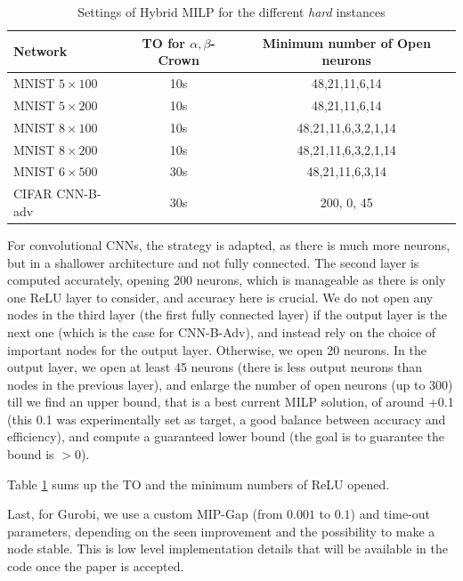 \begin{table}[t!]
	\centering
	\begin{tabular}{||l||c|c||}
		\hline \hline
		Network & TO for $\alpha,\beta$-Crown  & Minimum number of Open neurons  \\ 		  
		\hline
		MNIST $5 \times 100$ & 10s  & 48,21,11,6,14  \\ \hline
		MNIST $5 \times 200$ & 10s & 48,21,11,6,14  \\ \hline
		MNIST $8 \times 100$ & 10s  & 48,21,11,6,3,2,1,14  \\ \hline
		MNIST $8 \times 200$ & 10s & 48,21,11,6,3,2,1,14  \\ \hline
		MNIST $6 \times 500$ & 30s & 48,21,11,6,3,14 \\ \hline
		CIFAR CNN-B-adv & 30s & 200, 0, 45 \\ \hline \hline
	\end{tabular}
	\caption{Settings of Hybrid MILP for the different {\em hard} instances}
	\label{table20}
	\end{table}


For convolutional CNNs, the strategy is adapted, as there is much more neurons, but in a shallower architecture and not fully connected. 
The second layer is computed accurately, opening 200 neurons, which is manageable as there is only one ReLU layer to consider, and accuracy here is crucial.
We do not open any nodes in the third layer (the first fully connected layer) if the output layer is the next one (which is the case for CNN-B-Adv), and instead rely on the choice of important nodes for the output layer. Otherwise, we open 20 neurons.
In the output layer, we open at least 45 neurons (there is less output neurons than nodes in the previous layer), and enlarge the number of open neurons (up to 300) till we find an upper bound, that is a best current MILP solution, of around +0.1 (this 0.1 was experimentally set as target, a good balance between accuracy and efficiency), and compute a guaranteed lower bound (the goal is to guarantee the bound is $>0$).

Table \ref{table20} sums up the TO and the minimum numbers of ReLU opened.






Last, for Gurobi, we use a custom MIP-Gap (from $0.001$ to $0.1$) and time-out parameters, depending on the seen improvement and the possibility to make a node stable. This is low level implementation details that will be available in the code once the paper is accepted.

